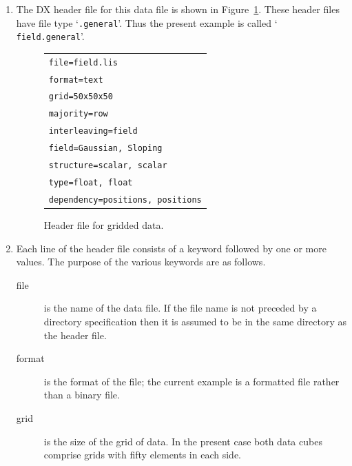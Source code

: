 \documentclass[twoside,11pt]{article}
\begin{document}
\begin{enumerate}

  \item The DX header file for this data file is shown in
   Figure~\ref{FIELD.GENERAL}. These header files have file type
   `{\tt .general}'. Thus the present example is called `{\tt
   field.general}'.

  \begin{figure}[htbp]

  \begin{center}
  \begin{tabular}{l}
   {\tt file=field.lis}       \\
   {\tt format=text}               \\
   {\tt grid=50x50x50}             \\
   {\tt majority=row}              \\
   {\tt interleaving=field}        \\
   {\tt field=Gaussian, Sloping}   \\
   {\tt structure=scalar, scalar}  \\
   {\tt type=float, float}         \\
   {\tt dependency=positions, positions} \\
  \end{tabular}
  \end{center}

  \caption[Header file for gridded data.]{Header file for gridded data.
  \label{FIELD.GENERAL} }

  \end{figure}

  \item Each line of the header file consists of a keyword followed by
   one or more values. The purpose of the various keywords are as
   follows.

  \begin{description}

    \item[file] is the name of the data file. If the file name is not
     preceded by a directory specification then it is assumed to be in
     the same directory as the header file.

    \item[format] is the format of the file; the current example is
     a formatted file rather than a binary file.

    \item[grid] is the size of the grid of data. In the present case
     both data cubes comprise grids with fifty elements in each side.


\end{description}
\end{enumerate}
\end{document}
